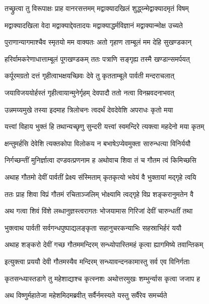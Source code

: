 \twolineshloka
{तच्छ्रुत्वा तु विरूपाक्षः प्राह वानरसत्तमम्}
{मद्वाक्यादखिलं शुद्ध्य्न्मेद्वाक्यादमृतं विषम्}%

\twolineshloka
{मद्वाक्यादखिला वेदा मद्वाक्याद्देवतादयः}
{मद्वाक्याद्धर्मविज्ञानं मद्वाक्यान्मोक्ष उच्यते}%

\twolineshloka
{पुराणान्यागमाश्चैव स्मृतयो मम वाक्यतः}
{अतो गृहाण ताम्बूलं मम देहि सुखण्डकान्}%

\twolineshloka
{हरिर्वामकरेणाधात्ताम्बूलं पूगखण्डकम्}
{ततः पत्राणि सङ्गृह्य तस्मै खण्डान्समर्पयत्}%

\twolineshloka
{कर्पूरमग्रतो दत्तं गृहीत्वाभक्षयच्छिवः}
{देवे तु कृतताम्बूले पार्वती मन्दराचलात्}%

\twolineshloka
{जयाविजययोर्हस्तं गृहीत्वायान्मुनेर्गृहम्}
{देवपादौ ततो नत्वा विनम्रवदनाभवत्}%

\twolineshloka
{उन्नमय्यमुखे तस्या इदमाह त्रिलोचनः}
{त्वदर्थं देवदेवेशि अपराधः कृतो मया}%

\twolineshloka
{यत्त्वां विहाय भुक्तं हि तथान्यच्छृणु सुन्दरी}
{यत्त्वां स्वमन्दिरे त्यक्त्वा महदेनो मया कृतम्}%

\twolineshloka
{क्षन्तुमर्हसि देवेशि त्यक्तकोपा विलोकय}
{न बभाषेऽप्येवमुक्ता सारुन्धत्या विनिर्ययौ}%

\twolineshloka
{निर्गच्छन्तीं मुनिर्ज्ञात्वा दण्डवत्प्रणनाम ह}
{अथोवाच शिवा तं च गौतम त्वं किमिच्छसि}%

\twolineshloka
{अथाह गौतमो देवीं पार्वतीं प्रेक्ष्य संस्मिताम्}
{कृतकृत्यो भवेयं वै भुक्तायां मद्गृहे त्वयि}%

\twolineshloka
{ततः प्राह शिवा विप्रं गौतमं रचिताञ्जलिम्}
{भोक्ष्यामि त्वद्गृहे विप्र शङ्करानुमतेन वै}%

\twolineshloka
{अथ गत्वा शिवं विंशे लब्धानुज्ञस्त्वरागतः}
{भोजयामास गिरिजां देवीं चारुन्धतीं तथा}%

\twolineshloka
{भुक्त्वाथ पार्वती सर्वगन्धपुष्पाद्यलङ्कृता}
{सहानुचरकन्याभिः सहस्राभिर्हरं ययौ}%

\twolineshloka
{अथाह शङ्करो देवीं गच्छ गौतममन्दिरम्}
{सन्ध्योपास्तिमहं कृत्वा ह्यागमिष्ये तवान्तिकम्}%

\twolineshloka
{इत्युक्त्वा प्रययौ देवी गौतमस्यैव मन्दिरम्}
{सन्ध्यावन्दनकामास्तु सर्व एव विनिर्गताः}%

\twolineshloka
{कृतसन्ध्यास्तडागे तु महेशाद्याश्च कृत्स्नशः}
{अथोत्तरमुखः शम्भुर्न्यास कृत्वा जजाप ह}%

\twolineshloka
{अथ विष्णुर्महातेजा महेशमिदमब्रवीत्}
{सर्वैर्नमस्यते यस्तु सर्वैरेव समर्च्यते}%

